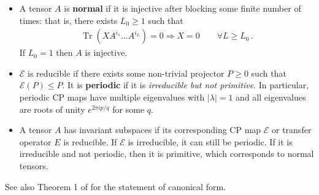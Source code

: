 \documentclass[11pt,letter,usenames,dvipsnames]{article}
\DeclareMathOperator{\Tr}{\text{Tr}}
\numberwithin{equation}{section}
\begin{document}
\begin{enumerate}[label=(\arabic*)]
\begin{itemize}
        

        \item A tensor $A$ is \textbf{normal} if it is injective after blocking some finite number of times: that is, there exists $L_0\geq 1$ such that
        \begin{align}
            \Tr(XA^{i_1}...A^{i_L}) = 0 \Longrightarrow X = 0\qquad \forall L\geq L_0\,.
        \end{align}
        If $L_0=1$ then $A$ is injective.

        \item $\mathcal{E}$ is reducible if there exists some non-trivial projector $P\geq 0$ such that $\mathcal{E}(P)\leq P$. It is \textbf{periodic} if it is \textit{irreducible but not primitive}. In particular, periodic CP maps have multiple eigenvalues with $|\lambda|=1$ and all eigenvalues are roots of unity $e^{2\pi i p/q}$ for some $q$. 

        \item A tensor $A$ has invariant subspaces if its corresponding CP map $\mathcal{E}$ or transfer operator $E$ is reducible. If $\mathcal{E}$ is irreducible, it can still be periodic. If it is irreducible and not periodic, then it is primitive, which corresponds to normal tensors.
    \end{itemize}
    
    See also Theorem 1 of \cite{fernandez2015uncle} for the statement of canonical form. 
\end{enumerate}




\clearpage


\end{document}

